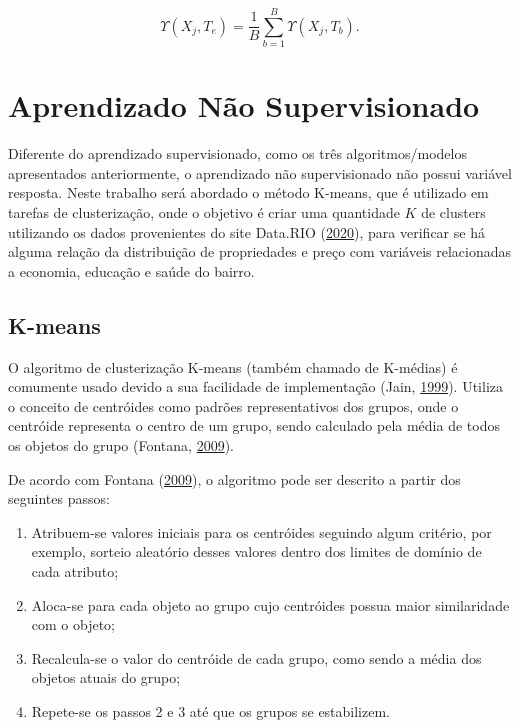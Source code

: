 \documentclass[
	12pt,				%
	a4paper,		%
	oneside,    %
	chapter=TITLE,		   %
	section=TITLE,		   %
	subsection=TITLE,	   %
	subsubsection=TITLE, %
	english,			%
	french,				%
	spanish,			%
	brazil,				%
]{abntex2}
\begin{document}
\[
\Upsilon(X_j, T_e) = \frac{1}{B} \sum^{B}_{b=1}\Upsilon(X_j, T_b). 
\]

\hypertarget{aprendizado-nuxe3o-supervisionado}{%
\section{Aprendizado Não
Supervisionado}\label{aprendizado-nuxe3o-supervisionado}}

Diferente do aprendizado supervisionado, como os três algoritmos/modelos
apresentados anteriormente, o aprendizado não supervisionado não possui
variável resposta. Neste trabalho será abordado o método K-means, que é
utilizado em tarefas de clusterização, onde o objetivo é criar uma
quantidade \(K\) de clusters utilizando os dados provenientes do site
Data.RIO (\protect\hyperlink{ref-datario}{2020}), para verificar se há
alguma relação da distribuição de propriedades e preço com variáveis
relacionadas a economia, educação e saúde do bairro.

\hypertarget{k-means}{%
\subsection{K-means}\label{k-means}}

O algoritmo de clusterização K-means (também chamado de K-médias) é
comumente usado devido a sua facilidade de implementação (Jain,
\protect\hyperlink{ref-jain1999data}{1999}). Utiliza o conceito de
centróides como padrões representativos dos grupos, onde o centróide
representa o centro de um grupo, sendo calculado pela média de todos os
objetos do grupo (Fontana, \protect\hyperlink{ref-fontanaestudo}{2009}).

De acordo com Fontana (\protect\hyperlink{ref-fontanaestudo}{2009}), o
algoritmo pode ser descrito a partir dos seguintes passos:

\begin{enumerate}
\def\labelenumi{\arabic{enumi}.}
\item
  Atribuem-se valores iniciais para os centróides seguindo algum
  critério, por exemplo, sorteio aleatório desses valores dentro dos
  limites de domínio de cada atributo;
\item
  Aloca-se para cada objeto ao grupo cujo centróides possua maior
  similaridade com o objeto;
\item
  Recalcula-se o valor do centróide de cada grupo, como sendo a média
  dos objetos atuais do grupo;
\item
  Repete-se os passos 2 e 3 até que os grupos se estabilizem.
\end{enumerate}
\end{document}
